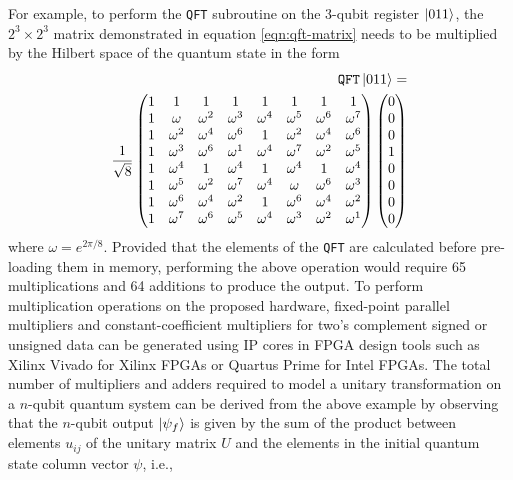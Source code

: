 For example, to perform the \texttt{QFT} subroutine on the 3-qubit register $\ket{011}$, the $2^3 \times 2^3$ matrix demonstrated in equation \ref{eqn:qft-matrix} needs to be multiplied by the Hilbert space of the quantum state in the form
\begin{align}\label{eqn:qft-example-2}
	\texttt{QFT}\ket{011} = \nonumber\\ \frac{1}{\sqrt{8}}\left(\begin{matrix}
		1 & 1 & 1 & 1 & 1 & 1 & 1 & 1\\
		1 & \omega & \omega^2	& \omega^3	& \omega^4	& \omega^5	& \omega^6	&	\omega^7\\
		1 & \omega^2 & \omega^4	& \omega^6	& 1	& \omega^2	& \omega^4	&	\omega^6\\
		1 & \omega^3 & \omega^6	& \omega^1	& \omega^4	& \omega^7	& \omega^2	&	\omega^5\\
		1 & \omega^4 & 1	& \omega^4	& 1	& \omega^4	& 1	&	\omega^4\\
		1 & \omega^5 & \omega^2	& \omega^7	& \omega^4	& \omega	& \omega^6	&	\omega^3\\
		1 & \omega^6 & \omega^4	& \omega^2	& 1	& \omega^6	& \omega^4	&	\omega^2\\
		1 & \omega^7 & \omega^6	& \omega^5	& \omega^4	& \omega^3	& \omega^2	&	\omega^1
	\end{matrix}\right) \left(\begin{matrix}
	0 \\ 0 \\ 0 \\ 1 \\ 0 \\ 0 \\0 \\0 
\end{matrix}\right)
\end{align}
where $\omega = e^{2\pi/8}$. Provided that the elements of the \texttt{QFT} are calculated before pre-loading them in memory, performing the above operation would require 65 multiplications and 64 additions to produce the output. To perform multiplication operations on the proposed hardware, fixed-point parallel multipliers and constant-coefficient multipliers for two's complement signed or unsigned data can be generated using IP cores in FPGA design tools such as Xilinx Vivado for Xilinx FPGAs or Quartus Prime for Intel FPGAs. The total number of multipliers and adders required to model a unitary transformation on a $n$-qubit quantum system can be derived from the above example by observing that the $n$-qubit output $\ket{\psi_f}$ is given by the sum of the product between elements $u_{ij}$ of the unitary matrix $U$ and the elements in the initial quantum state column vector $\psi$, i.e.,
